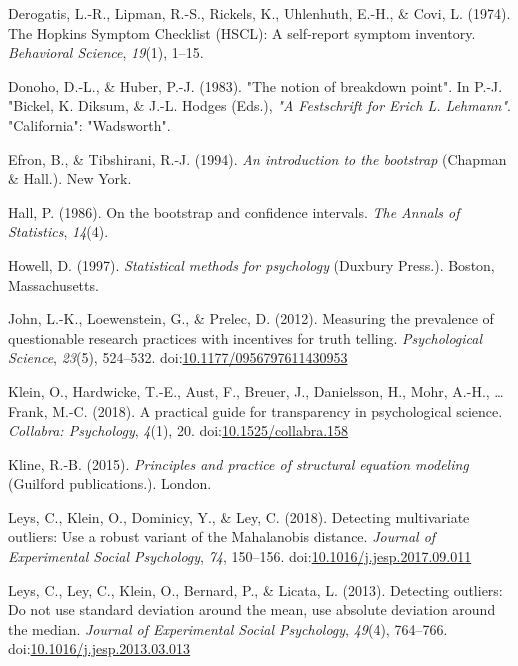 \documentclass[man,floatsintext]{apa6}
\begin{document}
\leavevmode\hypertarget{ref-Derogatis_et_al_1974}{}%
Derogatis, L.-R., Lipman, R.-S., Rickels, K., Uhlenhuth, E.-H., \& Covi, L. (1974). The Hopkins Symptom Checklist (HSCL): A self‐report symptom inventory. \emph{Behavioral Science}, \emph{19}(1), 1--15.

\leavevmode\hypertarget{ref-Donoho_and_Huber_1983}{}%
Donoho, D.-L., \& Huber, P.-J. (1983). "The notion of breakdown point". In P.-J. "Bickel, K. Diksum, \& J.-L. Hodges (Eds.), \emph{"A Festschrift for Erich L. Lehmann"}. "California": "Wadsworth".

\leavevmode\hypertarget{ref-Efron_Tibshirani_1994}{}%
Efron, B., \& Tibshirani, R.-J. (1994). \emph{An introduction to the bootstrap} (Chapman \& Hall.). New York.

\leavevmode\hypertarget{ref-Hall_1986}{}%
Hall, P. (1986). On the bootstrap and confidence intervals. \emph{The Annals of Statistics}, \emph{14}(4).

\leavevmode\hypertarget{ref-Howell_1997}{}%
Howell, D. (1997). \emph{Statistical methods for psychology} (Duxbury Press.). Boston, Massachusetts.

\leavevmode\hypertarget{ref-John_et_al_2012}{}%
John, L.-K., Loewenstein, G., \& Prelec, D. (2012). Measuring the prevalence of questionable research practices with incentives for truth telling. \emph{Psychological Science}, \emph{23}(5), 524--532. doi:\href{https://doi.org/10.1177/0956797611430953}{10.1177/0956797611430953}

\leavevmode\hypertarget{ref-Klein_et_al_2018}{}%
Klein, O., Hardwicke, T.-E., Aust, F., Breuer, J., Danielsson, H., Mohr, A.-H., \ldots{} Frank, M.-C. (2018). A practical guide for transparency in psychological science. \emph{Collabra: Psychology}, \emph{4}(1), 20. doi:\href{https://doi.org/10.1525/collabra.158}{10.1525/collabra.158}

\leavevmode\hypertarget{ref-Kline_2015}{}%
Kline, R.-B. (2015). \emph{Principles and practice of structural equation modeling} (Guilford publications.). London.

\leavevmode\hypertarget{ref-Leys_et_al_2018}{}%
Leys, C., Klein, O., Dominicy, Y., \& Ley, C. (2018). Detecting multivariate outliers: Use a robust variant of the Mahalanobis distance. \emph{Journal of Experimental Social Psychology}, \emph{74}, 150--156. doi:\href{https://doi.org/10.1016/j.jesp.2017.09.011}{10.1016/j.jesp.2017.09.011}

\leavevmode\hypertarget{ref-Leys_et_al_2013}{}%
Leys, C., Ley, C., Klein, O., Bernard, P., \& Licata, L. (2013). Detecting outliers: Do not use standard deviation around the mean, use absolute deviation around the median. \emph{Journal of Experimental Social Psychology}, \emph{49}(4), 764--766. doi:\href{https://doi.org/10.1016/j.jesp.2013.03.013}{10.1016/j.jesp.2013.03.013}
\end{document}
